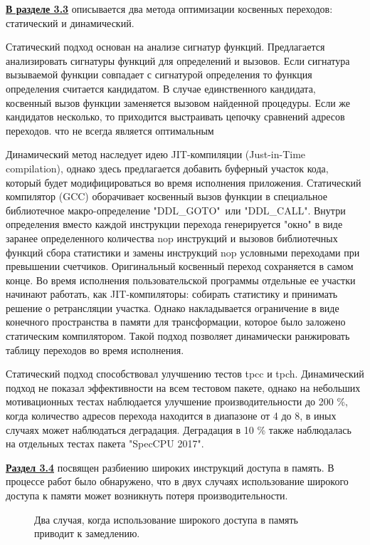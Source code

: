  \underline{\textbf{В разделе 3.3}} описывается два метода оптимизации косвенных переходов: статический и динамический.
 
 Статический подход основан на анализе сигнатур функций. Предлагается анализировать
 сигнатуры функций для определений и вызовов. Если сигнатура вызываемой
 функции совпадает с сигнатурой определения то функция
 определения считается кандидатом.  В случае
 единственного кандидата, косвенный вызов функции заменяется
 вызовом найденной процедуры. Если же кандидатов несколько, то приходится
 выстраивать цепочку сравнений адресов переходов. что не
 всегда является оптимальным
 
 
 Динамический метод наследует идею JIT-компиляции (Just-in-Time
 compilation), однако здесь предлагается
 добавить буферный участок кода, который будет модифицироваться во время исполнения приложения.
 Статический компилятор (GCC)  оборачивает косвенный вызов функции в специальное библиотечное макро-определение  "DDL\_GOTO"\  или "DDL\_CALL". Внутри определения вместо каждой инструкции
 перехода генерируется "окно" в виде заранее определенного
 количества nop инструкций и вызовов библиотечных функций сбора
 статистики и замены инструкций nop условными переходами при
 превышении счетчиков. Оригинальный косвенный переход
 сохраняется в самом конце. Во время исполнения пользовательской  программы отдельные ее участки начинают работать, как JIT-компиляторы: собирать статистику и принимать решение о ретрансляции участка. Однако накладывается ограничение в виде конечного пространства в памяти для трансформации, которое было заложено статическим компилятором. Такой подход позволяет динамически ранжировать таблицу переходов во время исполнения.
 
 Статический подход способствовал улучшению тестов tpcc и tpch. Динамический подход не показал эффективности на всем тестовом пакете, однако на небольших мотивационных тестах  наблюдается улучшение производительности до 200 \%, когда количество адресов перехода
 находится в диапазоне от 4 до 8, в иных случаях может наблюдаться деградация.
 Деградация в 10 \% также наблюдалась на отдельных тестах пакета
 "SpecCPU 2017".
 
\underline{\textbf{Раздел 3.4}} посвящен разбиению широких инструкций доступа в память. В процессе работ было обнаружено, что в двух случаях использование широкого доступа к памяти может
возникнуть потеря производительности. 
\begin{figure}[htbp]
	\centering
	
	\caption{Два случая, когда использование широкого доступа в память приводит к замедлению.}
	\label{splitsvg1}
\end{figure}


